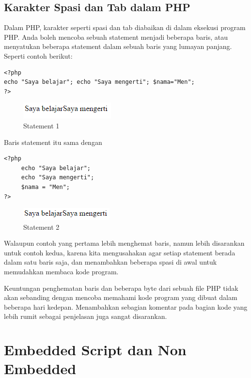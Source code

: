 \subsection{Karakter Spasi dan Tab dalam PHP}
Dalam PHP, karakter seperti spasi dan tab diabaikan di dalam eksekusi program PHP. Anda boleh mencoba sebuah statement menjadi beberapa baris, atau menyatukan beberapa statement dalam sebuah baris yang lumayan panjang. Seperti contoh berikut:
\begin{lstlisting}
<?php
echo "Saya belajar"; echo "Saya mengerti"; $nama="Men";
?>
\end{lstlisting}
\begin{figure}[h]
\centering
\includegraphics[scale=1]{figures/saya_belajar}
\caption{Statement 1}
\label{statement1}
\end{figure}
Baris statement itu sama dengan
 \begin{lstlisting}
<?php
     echo "Saya belajar";
     echo "Saya mengerti";
     $nama = "Men";
?>
\end{lstlisting}
\begin{figure}[h]
\centering
\includegraphics[scale=1]{figures/saya_belajar1}
\caption{Statement 2}
\label{statement2}
\end{figure}
Walaupun contoh yang pertama lebih menghemat baris, namun lebih disarankan untuk contoh kedua, karena kita mengusahakan agar setiap statement berada dalam satu baris saja, dan menambahkan beberapa spasi di awal untuk memudahkan membaca kode program.
\par
Keuntungan penghematan baris dan beberapa byte dari sebuah file PHP tidak akan sebanding dengan mencoba memahami kode program yang dibuat dalam beberapa hari kedepan. Menambahkan sebagian komentar pada bagian kode yang lebih rumit sebagai penjelasan juga sangat disarankan.
\section{Embedded Script dan Non Embedded}
